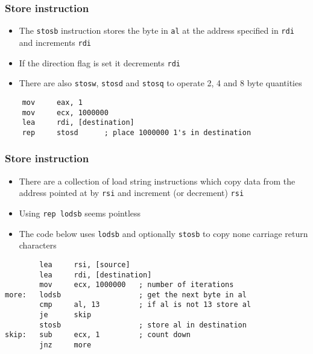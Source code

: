 \documentclass{beamer}
\begin{document}
\begin{frame}[fragile]
    \frametitle{Store instruction}
    \begin{itemize}
        \item The {\tt stosb} instruction stores the byte in {\tt al}
              at the address specified in {\tt rdi} and increments {\tt rdi}
        \item If the direction flag is set it decrements {\tt rdi}
        \item There are also {\tt stosw}, {\tt stosd} and {\tt stosq}
              to operate 2, 4 and 8 byte quantities
    \end{itemize}
\begin{verbatim}
    mov     eax, 1
    mov     ecx, 1000000
    lea     rdi, [destination]
    rep     stosd      ; place 1000000 1's in destination
\end{verbatim}
\end{frame}

\begin{frame}[fragile]
    \frametitle{Store instruction}
    \begin{itemize}
        \item There are a collection of load string instructions
              which copy data from the address pointed at by {\tt rsi}
              and increment (or decrement) {\tt rsi}
        \item Using {\tt rep lodsb} seems pointless
        \item The code below uses {\tt lodsb} and optionally {\tt stosb}
              to copy none carriage return characters
    \end{itemize}
\begin{verbatim}
        lea     rsi, [source]
        lea     rdi, [destination]
        mov     ecx, 1000000   ; number of iterations
more:   lodsb                  ; get the next byte in al
        cmp     al, 13         ; if al is not 13 store al
        je      skip
        stosb                  ; store al in destination
skip:   sub     ecx, 1         ; count down
        jnz     more
\end{verbatim}
\end{frame}
\end{document}
